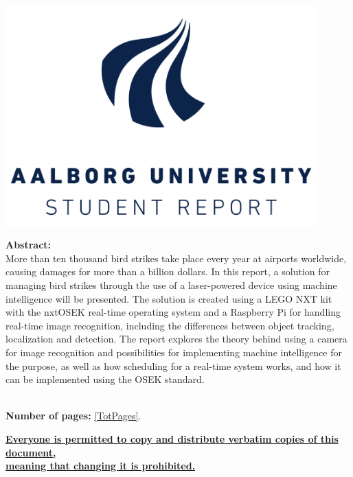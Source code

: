 \begin{minipage}[T]{0.45\textwidth}
 \begin{flushright}
  \includegraphics[width=0.9\textwidth]{images/aau_logo.pdf}\\
 \end{flushright}
 \begin{flushleft}
  \textbf{Abstract:}\\
    More than ten thousand bird strikes take place every year at airports worldwide, causing damages for more than a billion dollars. 
    In this report, a solution for managing bird strikes through the use of a laser-powered device using machine intelligence will be presented.
    The solution is created using a LEGO NXT kit with the nxtOSEK real-time operating system and a Raspberry Pi for handling real-time image recognition, including the differences between object tracking, localization and detection.
    The report explores the theory behind using a camera for image recognition and possibilities for implementing machine intelligence for the purpose, as well as how scheduling for a real-time system works, and how it can be implemented using the OSEK standard.


 \end{flushleft}
\end{minipage}\\
\large{\textsf{\textbf{\normalsize{Number of pages:}}}} \ref{TotPages}.\\
\begin{center}
 \begin{scriptsize}
  \textbf{\underline{Everyone is permitted to copy and distribute verbatim copies of this document,}}\\ \textbf{\underline{ meaning that changing it is prohibited.}}
 \end{scriptsize}
\end{center}
